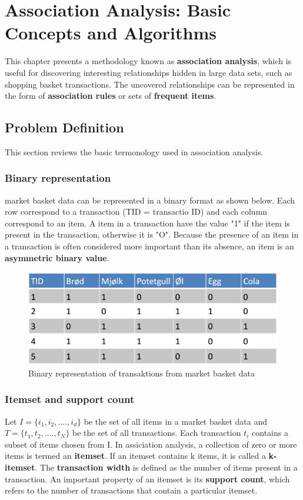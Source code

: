 \chapter{Association Analysis: Basic Concepts and Algorithms}

	This chapter presents a methodology known as {\bf association analysis},
	which is useful for discovering interesting relationships hidden in large
	data sets, such as shopping basket transactions. 
	The uncovered relationships can be represented in the form of 
	{\bf association rules} or sets of {\bf frequent items}. 

	\clearpage
	\section{Problem Definition}

	This section reviews the basic termonology used in association analysis.

		\subsection*{Binary representation} 
		market basket data can be represented in a binary
		format as shown below. Each row correspond to a transaction (TID = transactio ID)
		and each column correspond to an item. A item in a transaction have the value
		"1" if the item is present in the transaction, otherwise it is "O".
		Because the presence of an item in a transaction is often considered more
		important than its absence, an item is an {\bf asymmetric binary value}.

		\begin{figure}[H]
		\centering
			\includegraphics[scale = 0.4]{pics/binary.png}
			\caption{Binary representation of transaktions from market basket data}
		\end{figure}

		\subsection*{Itemset and support count} 
		Let $ I = \{i_{1}, i_{2}, ...., i_{d}\}$ be the
		set of all items in a market basket data and $ T = \{t_{1}, t_{2},....,t_{N}\}$
		be the set of all transactions. Each transaction $t_{i}$ contains a subset of items
		chosen from I. In assiciation analysis, a collection of zero or more items
		is termed an {\bf itemset}. If an itemset contains k items, it is called a {\bf k-itemset}.
		The {\bf transaction width} is defined as the number of items present in a transaction.
		An important property of an itemset is its {\bf support count}, which refers to the 
		number of transactions that contain a particular itemset. 

